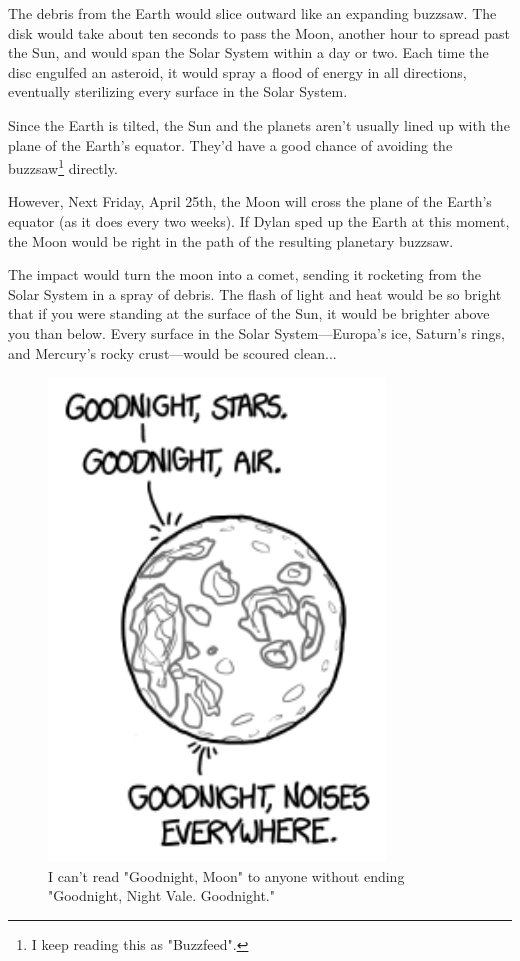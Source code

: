 {{The debris from the Earth would slice outward like an expanding buzzsaw. The disk would take about ten seconds to pass the Moon, another hour to spread past the Sun, and would span the Solar System within a day or two. Each time the disc engulfed an asteroid, it would spray a flood of energy in all directions, eventually sterilizing every surface in the Solar System.}

{Since the Earth is tilted, the Sun and the planets aren't usually lined up with the plane of the Earth's equator. They'd have a good chance of avoiding the buzzsaw{\footnote{I keep reading this as "Buzzfeed".} } directly.}

{However, Next Friday, April 25th, the Moon will cross the plane of the Earth's equator (as it does every two weeks). If Dylan sped up the Earth at this moment, the Moon would be right in the path of the resulting planetary buzzsaw.}

{The impact would turn the moon into a comet, sending it rocketing from the Solar System in a spray of debris. The flash of light and heat would be so bright that if you were standing at the surface of the Sun, it would be brighter above you than below. Every surface in the Solar System—Europa's ice, Saturn's rings, and Mercury's rocky crust—would be scoured clean...}

\begin{figure}[!htbp]
\centering
\includegraphics[scale=0.5, max width=0.8\textwidth]{imgs/a/92/day_goodnight.png}
\caption{I can't read "Goodnight, Moon" to anyone without ending "Goodnight, Night Vale. Goodnight."}
\end{figure}

}
